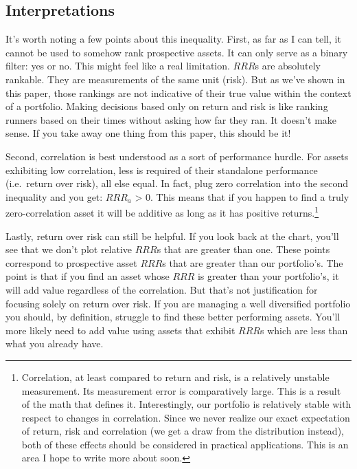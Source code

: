 \documentclass[]{article}
\let\rmarkdownfootnote\footnote%
\def\footnote{\protect\rmarkdownfootnote}
\begin{document}
\hypertarget{interpretations}{%
\subsection{Interpretations}\label{interpretations}}

It's worth noting a few points about this inequality. First, as far as I
can tell, it cannot be used to somehow rank prospective assets. It can
only serve as a binary filter: yes or no. This might feel like a real
limitation. \(RRR\)s are absolutely rankable. They are measurements of
the same unit (risk). But as we've shown in this paper, those rankings
are not indicative of their true value within the context of a
portfolio. Making decisions based only on return and risk is like
ranking runners based on their times without asking how far they ran. It
doesn't make sense. If you take away one thing from this paper, this
should be it!

Second, correlation is best understood as a sort of performance hurdle.
For assets exhibiting low correlation, less is required of their
standalone performance (i.e.~return over risk), all else equal. In fact,
plug zero correlation into the second inequality and you get: \(RRR_a\)
\textgreater{} 0. This means that if you happen to find a truly
zero-correlation asset it will be additive as long as it has positive
returns.\footnote{Correlation, at least compared to return and risk, is
  a relatively unstable measurement. Its measurement error is
  comparatively large. This is a result of the math that defines it.
  Interestingly, our portfolio is relatively stable with respect to
  changes in correlation. Since we never realize our exact expectation
  of return, risk and correlation (we get a draw from the distribution
  instead), both of these effects should be considered in practical
  applications. This is an area I hope to write more about soon.}

Lastly, return over risk can still be helpful. If you look back at the
chart, you'll see that we don't plot relative \(RRR\)s that are greater
than one. These points correspond to prospective asset \(RRR\)s that are
greater than our portfolio's. The point is that if you find an asset
whose \(RRR\) is greater than your portfolio's, it will add value
regardless of the correlation. But that's not justification for focusing
solely on return over risk. If you are managing a well diversified
portfolio you should, by definition, struggle to find these better
performing assets. You'll more likely need to add value using assets
that exhibit \(RRR\)s which are less than what you already have.
\end{document}
